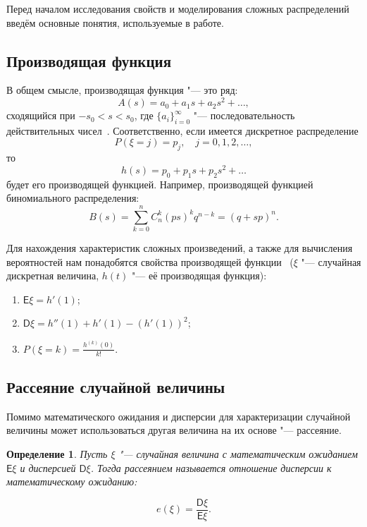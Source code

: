 \documentclass[12pt, specialist, subf, substylefile = spbu_report.rtx]{disser}
\newtheorem{define}{Определение}
\begin{document}
	Перед началом исследования свойств и моделирования сложных распределений введём основные понятия, используемые в работе.
	
	\subsection{Производящая функция}
	
	В общем смысле, производящая функция "--- это ряд:
	\[
		A(s) = a _0 + a _1 s + a _2 s ^2 + \dots,
	\]
	сходящийся при $ -s _0 < s < s _0 $, где $ \{ a _i \} ^{\infty} _{i = 0} $ "--- последовательность действительных чисел~\cite{bib:feller1952}. Соответственно, если имеется дискретное распределение
	\[
		P(\xi = j) = p _j, \quad j = 0, 1, 2, \dots,
	\]
	то
	\[
		h(s) = p _0 + p _1 s + p _2 s ^2 + \dots
	\]
	будет его производящей функцией. Например, производящей функцией биномиального распределения:
	\[
		B(s) = \sum \limits ^n _{k = 0} C ^k _n (ps) ^k q ^{n - k} = (q + sp) ^n.
	\]
	
	Для нахождения характеристик сложных произведений, а также для вычисления вероятностей нам понадобятся свойства производящей функции~\cite{bib:feller1952} ($ \xi $ "--- случайная дискретная величина, $ h(t) $ "--- её производящая функция):
	
	\begin{enumerate}
		\item $ \mathsf{E} \xi = h' (1) $;
		
		\item $ \mathsf{D} \xi = h''(1) + h'(1) - \left( h' (1) \right) ^2 $;
		
		\item $ P(\xi = k) = \frac{h^{(k)}(0)} {k!} $.
	\end{enumerate}

	\subsection{Рассеяние случайной величины}
	
	Помимо математического ожидания и дисперсии для характеризации случайной величины может использоваться другая величина на их основе "--- рассеяние.
	
	\begin{define}
		Пусть $ \xi $ "--- случайная величина с математическим ожиданием $ \mathsf{E} \xi $ и дисперсией $ \mathsf{D} \xi $. Тогда рассеянием называется отношение дисперсии к математическому ожиданию:
		
		\[
			e (\xi) = \frac {\mathsf{D} \xi} {\mathsf{E} \xi}.
		\]
		\label{def:scattering}
	\end{define}
\end{document}
